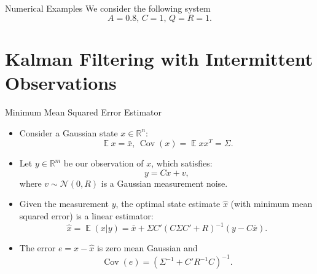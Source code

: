 \documentclass[10pt]{beamer}
\newlength\figureheight
\newlength\figurewidth
\newcommand{\tikzdir}[1]{#1.tikz}
\newcommand{\inputtikz}[1]{}}
\DeclareMathOperator{\1}{\textbf{1}}
\DeclareMathOperator{\Cov}{Cov}
\DeclareMathOperator{\E}{\mathbb E}
\begin{document}
  \begin{frame}{Numerical Examples}
    We consider the following system
    \begin{displaymath}
     A = 0.8,\,C = 1,\, Q = R = 1. 
    \end{displaymath}
	\setlength\figureheight{5cm}
	\setlength\figurewidth{8cm}
    \begin{center}
      \inputtikz{eventbased}
    \end{center}
  \end{frame}



  \frame{\tableofcontents[currentsection]}

  \section{Kalman Filtering with Intermittent Observations}
\begin{frame}{Minimum Mean Squared Error Estimator}
  \begin{itemize}
    \item Consider a Gaussian state $x\in \mathbb R^n$:
      \begin{displaymath}
	\E x = \bar x,\,\Cov(x) = \E xx^T = \Sigma.
      \end{displaymath}
    \item Let $y\in\mathbb R^m$ be our observation of $x$, which satisfies:
      \begin{displaymath}
	y = C x + v,
      \end{displaymath}
      where $v\sim \mathcal N(0,R)$ is a Gaussian measurement noise. 
    \item Given the measurement $y$, the optimal state estimate $\hat x$ (with minimum mean squared error) is a linear estimator:
      \begin{displaymath}
	\hat x = \E (x|y) = \bar x + \Sigma C'(C\Sigma C'+R)^{-1}(y-C\bar x).
      \end{displaymath}
    \item The error $e = x - \hat x$ is zero mean Gaussian and
      \begin{displaymath}
	\Cov(e) = (\Sigma^{-1} +  C'  R^{-1}C)^{-1}.
      \end{displaymath}
  \end{itemize}
\end{frame}
\end{document}
